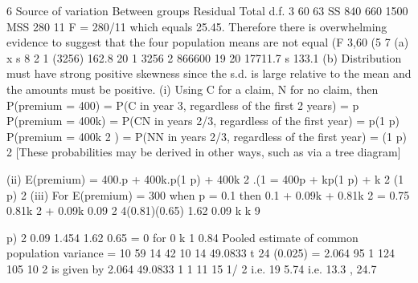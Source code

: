 \documentclass[a4paper,12pt]{article}
\begin{document}
6
Source of variation
Between groups
Residual
Total
d.f.
3
60
63
SS
840
660
1500
MSS
280
11
F = 280/11 which equals 25.45.
Therefore there is overwhelming evidence to suggest that the four population
means are not equal (F 3,60 (5%
7
(a)
x
s
8
2
1
(3256) 162.8
20
1
3256 2
866600
19
20
17711.7
s 133.1
(b) Distribution must have strong positive skewness
since the s.d. is large relative to the mean and the amounts must be positive.
(i) Using C for a claim, N for no claim, then
P(premium = 400) = P(C in year 3, regardless of the first 2 years) = p
P(premium = 400k) = P(CN in years 2/3, regardless of the first year) = p(1 p)
P(premium = 400k 2 ) = P(NN in years 2/3, regardless of the first year) = (1 p) 2
[These probabilities may be derived in other ways, such as via a tree diagram]



(ii) E(premium) = 400.p + 400k.p(1 p) + 400k 2 .(1
= 400{p + kp(1 p) + k 2 (1 p) 2 }
(iii) For E(premium) = 300 when p = 0.1
then 0.1 + 0.09k + 0.81k 2 = 0.75
0.81k 2 + 0.09k
0.09 2 4(0.81)(0.65)
1.62
0.09
k
k
9

p) 2
0.09 1.454
1.62
0.65 = 0
for 0 k 1
0.84
Pooled estimate of common population variance =
10 59
14 42
10 14
49.0833
t 24 (0.025) = 2.064
95%
1
124 105
10
2
is given by
2.064
49.0833
1 1
11 15
1/ 2
i.e. 19 5.74 i.e. 13.3 , 24.7
\end{document}
